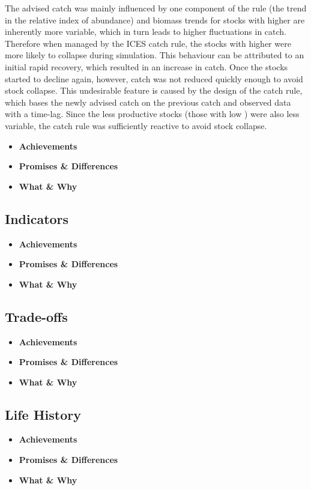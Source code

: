 The advised catch was mainly influenced by one component of the rule (the trend in the relative index of abundance) and biomass trends for stocks with higher  are inherently more variable, which in turn leads to higher fluctuations in catch. Therefore when managed by the ICES catch rule, the stocks with higher  were more likely to collapse during simulation. This behaviour can be attributed to an initial rapid recovery, which resulted in an increase in catch. Once the stocks started to decline again, however, catch was not reduced quickly enough to avoid stock collapse. This undesirable feature is caused by the design of the catch rule, which bases the newly advised catch on the previous catch and observed data with a time-lag. Since the less productive stocks (those with low ) were also less variable, the catch rule was sufficiently reactive to avoid stock collapse.

\begin{itemize}[labelindent=\parindent,noitemsep,topsep=0pt,parsep=0pt,partopsep=0pt]
 \item \textbf{Achievements}
 \item \textbf{Promises \& Differences}
 \item \textbf{What \& Why}
\end{itemize}

\subsection{Indicators}
\begin{itemize}[labelindent=\parindent,noitemsep,topsep=0pt,parsep=0pt,partopsep=0pt]
 \item \textbf{Achievements}
 \item \textbf{Promises \& Differences}
 \item \textbf{What \& Why}
\end{itemize}

\subsection{Trade-offs}
\begin{itemize}[labelindent=\parindent,noitemsep,topsep=0pt,parsep=0pt,partopsep=0pt]
 \item \textbf{Achievements}
 \item \textbf{Promises \& Differences}
 \item \textbf{What \& Why}
\end{itemize}

\subsection{Life History}
\begin{itemize}[labelindent=\parindent,noitemsep,topsep=0pt,parsep=0pt,partopsep=0pt]
 \item \textbf{Achievements}
 \item \textbf{Promises \& Differences}
 \item \textbf{What \& Why}
\end{itemize}

\newpage\clearpage


%
